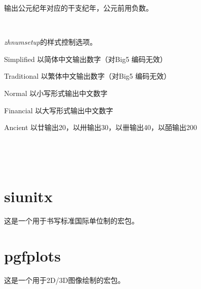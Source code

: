 输出公元纪年对应的干支纪年，公元前用负数。

\begin{codeshow}
 \\
\zhganzhinian{\year}
\end{codeshow}

\emph{zhnumsetup}的样式控制选项。

\begin{asparadesc}
    \item [Simplified] 以简体中文输出数字（对Big5 编码无效）
    \item [Traditional] 以繁体中文输出数字（对Big5 编码无效）
    \item [Normal] 以小写形式输出中文数字
    \item [Financial] 以大写形式输出中文数字
    \item [Ancient] 以廿输出20，以卅输出30，以卌输出40，以皕输出200
\end{asparadesc}

\begin{codeshow}
\\
\end{codeshow}

\begin{codeshow}
\\
\end{codeshow}


\section{siunitx}
这是一个用于书写标准国际单位制的宏包。

\section{pgfplots}
这是一个用于2D/3D图像绘制的宏包。
















